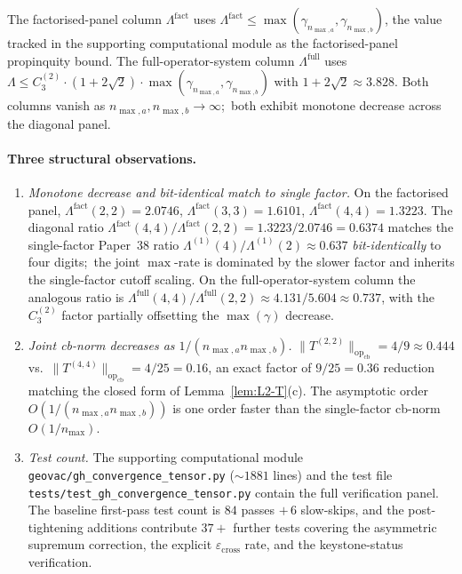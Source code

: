 \documentclass[11pt,a4paper]{article}
\theoremstyle{plain}
\theoremstyle{definition}
\newcommand{\nmax}{n_{\max}}
\newcommand{\nmaxa}{n_{\max,a}}
\newcommand{\nmaxb}{n_{\max,b}}
\newcommand{\opnorm}[1]{\lVert #1 \rVert_{\mathrm{op}}}
\begin{document}
The factorised-panel column $\Lambda^{\mathrm{fact}}$ uses
$\Lambda^{\mathrm{fact}} \le \max(\gamma_{\nmaxa}, \gamma_{\nmaxb})$,
the value tracked in the supporting computational module as the
factorised-panel propinquity bound. The full-operator-system column
$\Lambda^{\mathrm{full}}$ uses
$\Lambda \le C_3^{(2)} \cdot (1 + 2\sqrt{2}) \cdot
\max(\gamma_{\nmaxa}, \gamma_{\nmaxb})$ with $1 + 2\sqrt{2} \approx
3.828$. Both columns vanish as $\nmaxa, \nmaxb \to \infty$;\ both
exhibit monotone decrease across the diagonal panel.

\paragraph{Three structural observations.}
\begin{enumerate}
\item \emph{Monotone decrease and bit-identical match to single
factor.} On the factorised panel,
$\Lambda^{\mathrm{fact}}(2,2) = 2.0746$,
$\Lambda^{\mathrm{fact}}(3,3) = 1.6101$,
$\Lambda^{\mathrm{fact}}(4,4) = 1.3223$. The diagonal ratio
$\Lambda^{\mathrm{fact}}(4,4) / \Lambda^{\mathrm{fact}}(2,2) =
1.3223/2.0746 = 0.6374$ matches the single-factor Paper~38 ratio
$\Lambda^{(1)}(4)/\Lambda^{(1)}(2) \approx 0.637$
\emph{bit-identically} to four digits;\ the joint $\max$-rate is
dominated by the slower factor and inherits the single-factor cutoff
scaling. On the full-operator-system column the analogous ratio is
$\Lambda^{\mathrm{full}}(4,4)/\Lambda^{\mathrm{full}}(2,2) \approx
4.131/5.604 \approx 0.737$, with the $C_3^{(2)}$ factor partially
offsetting the $\max(\gamma)$ decrease.

\item \emph{Joint cb-norm decreases as $1/(\nmaxa \nmaxb)$.}
$\opnorm{T^{(2,2)}}_{\mathrm{cb}} = 4/9 \approx 0.444$ vs.\
$\opnorm{T^{(4,4)}}_{\mathrm{cb}} = 4/25 = 0.16$, an exact factor of
$9/25 = 0.36$ reduction matching the closed form of
Lemma~\ref{lem:L2-T}(c). The asymptotic order
$O(1/(\nmaxa \nmaxb))$ is one order faster than the single-factor
cb-norm $O(1/\nmax)$.

\item \emph{Test count.} The supporting computational module
\texttt{geovac/gh\_convergence\_tensor.py} ($\sim 1881$ lines) and
the test file \texttt{tests/test\_gh\_convergence\_tensor.py} contain
the full verification panel. The baseline first-pass test count is
$84$ passes $+\,6$ slow-skips, and the post-tightening additions
contribute $37+$ further tests covering the asymmetric supremum
correction, the explicit $\varepsilon_{\mathrm{cross}}$ rate, and the
keystone-status verification.
\end{enumerate}
\end{document}
